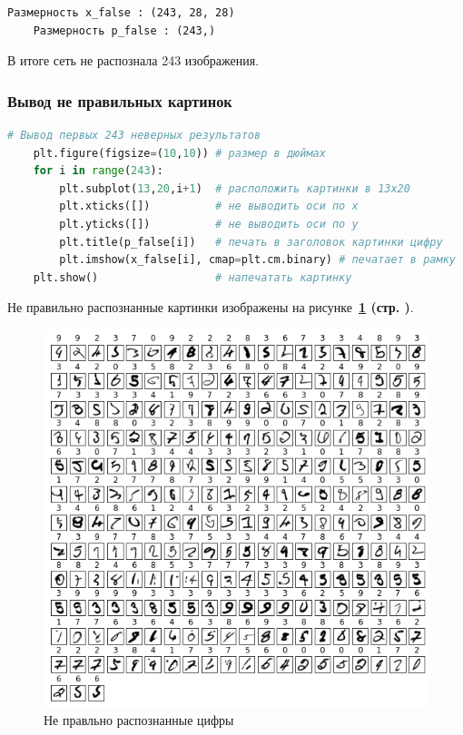 \begin{lstlisting}[name=Вывод в консоль,]
    Размерность x_false : (243, 28, 28)
    Размерность p_false : (243,)
\end{lstlisting}

В итоге сеть не распознала 243 изображения.



\subsubsection*{Вывод не правильных картинок}

\begin{lstlisting}[language=Python,]
    # Вывод первых 243 неверных результатов
    plt.figure(figsize=(10,10)) # размер в дюймах
    for i in range(243):
        plt.subplot(13,20,i+1)  # расположить картинки в 13x20
        plt.xticks([])          # не выводить оси по x
        plt.yticks([])          # не выводить оси по y
        plt.title(p_false[i])   # печать в заголовок картинки цифру
        plt.imshow(x_false[i], cmap=plt.cm.binary) # печатает в рамку
    plt.show()                  # напечатать картинку
\end{lstlisting}

Не правильно распознанные картинки изображены на
рисунке~\textbf{\ref{fig:4_not_right_imgs} (стр. \pageref{fig:4_not_right_imgs})}.

\begin{figure}[!htbp]
    \centering
    \includegraphics[width=16cm]
    {../_INCLUDES/main/4/not_right_imgs.png}
    \caption{Не правльно распознанные цифры}
    \label{fig:4_not_right_imgs}
\end{figure}